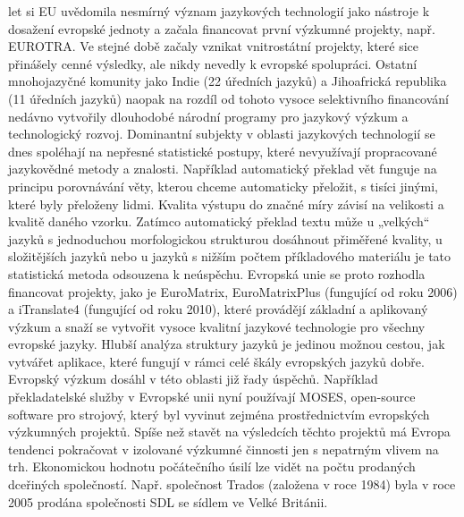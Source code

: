\begin{multicols}{2}

let si EU uvědomila nesmírný význam jazykových technologií jako nástroje k dosažení evropské jednoty a začala financovat první výzkumné projekty, např. EUROTRA. Ve stejné době začaly vznikat vnitrostátní projekty, které sice přinášely cenné výsledky, ale nikdy nevedly k evropské spolupráci. Ostatní mnohojazyčné komunity jako Indie (22 úředních jazyků) a Jihoafrická republika (11 úředních jazyků) naopak na rozdíl od tohoto vysoce selektivního financování nedávno vytvořily dlouhodobé národní programy pro jazykový výzkum a technologický rozvoj. Dominantní subjekty v oblasti jazykových technologií se dnes spoléhají na nepřesné statistické postupy, které nevyužívají propracované jazykovědné metody a znalosti. Například automatický překlad vět funguje na principu porovnávání věty, kterou chceme automaticky přeložit, s tisíci jinými, které byly přeloženy lidmi. Kvalita výstupu do značné míry závisí na velikosti a kvalitě daného vzorku. Zatímco automatický překlad textu může u „velkých“ jazyků s jednoduchou morfologickou strukturou dosáhnout přiměřené kvality, u složitějších jazyků nebo u jazyků s nižším počtem příkladového materiálu je tato statistická metoda odsouzena k neúspěchu.
Evropská unie se proto rozhodla financovat projekty, jako je EuroMatrix, EuroMatrixPlus (fungující od roku 2006) a iTranslate4 (fungující od roku 2010), které provádějí základní a aplikovaný výzkum a snaží se vytvořit vysoce kvalitní jazykové technologie pro všechny evropské jazyky. Hlubší analýza struktury jazyků je jedinou možnou cestou, jak vytvářet aplikace, které fungují v rámci celé škály evropských jazyků dobře.
Evropský výzkum dosáhl v této oblasti již řady úspěchů. Například překladatelské služby v Evropské unii nyní používají MOSES, open-source software pro strojový, který byl vyvinut zejména prostřednictvím evropských výzkumných projektů. Spíše než stavět na výsledcích těchto projektů má Evropa tendenci pokračovat v izolované výzkumné činnosti jen s nepatrným vlivem na trh. Ekonomickou hodnotu počátečního úsilí lze vidět na počtu prodaných dceřiných společností. Např. společnost Trados (založena v roce 1984) byla v roce 2005 prodána společnosti SDL se sídlem ve Velké Británii.



\end{multicols}
